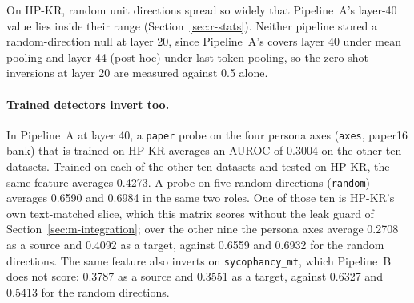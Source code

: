 On HP-KR, random unit directions spread so widely that Pipeline~A's layer-40 value lies inside their range (Section~\ref{sec:r-stats}). %
Neither pipeline stored a random-direction null at layer 20, since Pipeline~A's covers layer 40 under mean pooling and layer 44 (post hoc) under last-token pooling, so the zero-shot inversions at layer 20 are measured against 0.5 alone. %

\paragraph{Trained detectors invert too.} In Pipeline~A at layer 40, a \texttt{paper} probe on the four persona axes (\texttt{axes}, paper16 bank) that is trained on HP-KR averages an AUROC of 0.3004 on the other ten datasets. %
Trained on each of the other ten datasets and tested on HP-KR, the same feature averages 0.4273. %
A probe on five random directions (\texttt{random}) averages 0.6590 and 0.6984 in the same two roles. %
One of those ten is HP-KR's own text-matched slice, which this matrix scores without the leak guard of Section~\ref{sec:m-integration}; over the other nine the persona axes average 0.2708 as a source and 0.4092 as a target, against 0.6559 and 0.6932 for the random directions. %
The same feature also inverts on \texttt{sycophancy\_mt}, which Pipeline~B does not score: 0.3787 as a source and 0.3551 as a target, against 0.6327 and 0.5413 for the random directions. %
